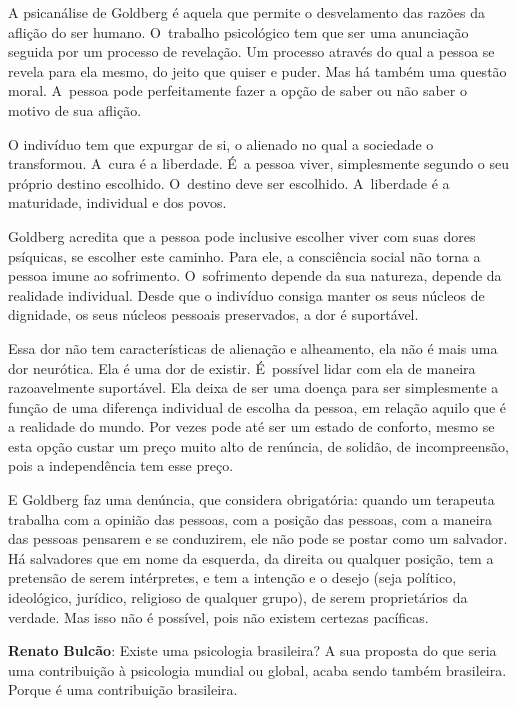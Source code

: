 A psicanálise de Goldberg é aquela que permite o desvelamento das razões
da aflição do ser humano. O~trabalho psicológico tem que ser uma
anunciação seguida por um processo de revelação. Um processo através do
qual a pessoa se revela para ela mesmo, do jeito que quiser e puder. Mas
há também uma questão moral. A~pessoa pode perfeitamente fazer a opção
de saber ou não saber o motivo de sua aflição.

O indivíduo tem que expurgar de si, o alienado no qual a sociedade o
transformou. A~cura é a liberdade. É~a pessoa viver, simplesmente
segundo o seu próprio destino escolhido. O~destino deve ser escolhido. A~liberdade é a maturidade, individual e dos povos.

Goldberg acredita que a pessoa pode inclusive escolher viver com suas
dores psíquicas, se escolher este caminho. Para ele, a consciência
social não torna a pessoa imune ao sofrimento. O~sofrimento depende da
sua natureza, depende da realidade individual. Desde que o indivíduo
consiga manter os seus núcleos de dignidade, os seus núcleos pessoais
preservados, a dor é suportável.

Essa dor não tem características de alienação e alheamento, ela não é
mais uma dor neurótica. Ela é uma dor de existir. É~possível lidar com
ela de maneira razoavelmente suportável. Ela deixa de ser uma doença
para ser simplesmente a função de uma diferença individual de escolha da
pessoa, em relação aquilo que é a realidade do mundo. Por vezes pode até
ser um estado de conforto, mesmo se esta opção custar um preço muito
alto de renúncia, de solidão, de incompreensão, pois a independência tem
esse preço.

E Goldberg faz uma denúncia, que considera obrigatória: quando um
terapeuta trabalha com a opinião das pessoas, com a posição das pessoas,
com a maneira das pessoas pensarem e se conduzirem, ele não pode se
postar como um salvador. Há salvadores que em nome da esquerda, da
direita ou qualquer posição, tem a pretensão de serem intérpretes, e tem
a intenção e o desejo (seja político, ideológico, jurídico, religioso de
qualquer grupo), de serem proprietários da verdade. Mas isso não é
possível, pois não existem certezas pacíficas.

\begin{center}\asterisc{}\end{center}

  \abrefala

\textbf{Renato} \textbf{Bulcão}: Existe uma psicologia brasileira? A sua
proposta do que seria uma contribuição à psicologia mundial ou global,
acaba sendo também brasileira. Porque é uma contribuição brasileira.

